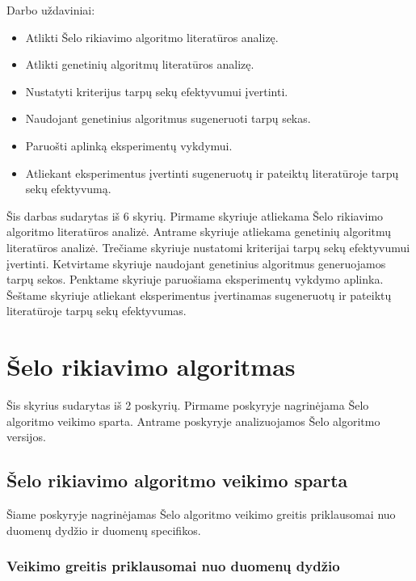 \documentclass{VUMIFInfKursinis}
\begin{document}
Darbo uždaviniai:
\begin{itemize}
  \item Atlikti Šelo rikiavimo algoritmo literatūros analizę.
  \item Atlikti genetinių algoritmų literatūros analizę.
  \item Nustatyti kriterijus tarpų sekų efektyvumui įvertinti.
  \item Naudojant genetinius algoritmus sugeneruoti tarpų sekas.
  \item Paruošti aplinką eksperimentų vykdymui.
  \item Atliekant eksperimentus įvertinti sugeneruotų ir pateiktų literatūroje tarpų sekų efektyvumą.
\end{itemize}

Šis darbas sudarytas iš 6 skyrių.
Pirmame skyriuje atliekama Šelo rikiavimo algoritmo literatūros analizė.
Antrame skyriuje atliekama genetinių algoritmų literatūros analizė.
Trečiame skyriuje nustatomi kriterijai tarpų sekų efektyvumui įvertinti.
Ketvirtame skyriuje naudojant genetinius algoritmus generuojamos tarpų sekos.
Penktame skyriuje paruošiama eksperimentų vykdymo aplinka.
Šeštame skyriuje atliekant eksperimentus įvertinamas sugeneruotų ir pateiktų literatūroje tarpų sekų efektyvumas.

\section{Šelo rikiavimo algoritmas}

Šis skyrius sudarytas iš 2 poskyrių.
Pirmame poskyryje nagrinėjama Šelo algoritmo veikimo sparta.
Antrame poskyryje analizuojamos Šelo algoritmo versijos.

\subsection{Šelo rikiavimo algoritmo veikimo sparta}

Šiame poskyryje nagrinėjamas Šelo algoritmo veikimo greitis priklausomai nuo duomenų dydžio ir duomenų specifikos.

\subsubsection{Veikimo greitis priklausomai nuo duomenų dydžio}
\end{document}
